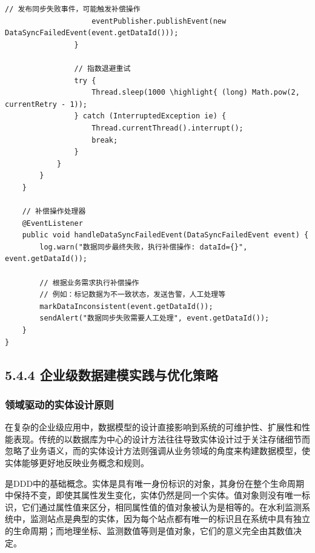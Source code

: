 \begin{lstlisting}[style=java]
                    // 发布同步失败事件，可能触发补偿操作
                    eventPublisher.publishEvent(new DataSyncFailedEvent(event.getDataId()));
                }
                
                // 指数退避重试
                try {
                    Thread.sleep(1000 \highlight{ (long) Math.pow(2, currentRetry - 1));
                } catch (InterruptedException ie) {
                    Thread.currentThread().interrupt();
                    break;
                }
            }
        }
    }
    
    // 补偿操作处理器
    @EventListener
    public void handleDataSyncFailedEvent(DataSyncFailedEvent event) {
        log.warn("数据同步最终失败，执行补偿操作: dataId={}", event.getDataId());
        
        // 根据业务需求执行补偿操作
        // 例如：标记数据为不一致状态，发送告警，人工处理等
        markDataInconsistent(event.getDataId());
        sendAlert("数据同步失败需要人工处理", event.getDataId());
    }
}
\end{lstlisting}

\hypertarget{ux4f01ux4e1aux7ea7ux6570ux636eux5efaux6a21ux5b9eux8df5ux4e0eux4f18ux5316ux7b56ux7565}{%
\subsection{5.4.4 企业级数据建模实践与优化策略}\label{ux4f01ux4e1aux7ea7ux6570ux636eux5efaux6a21ux5b9eux8df5ux4e0eux4f18ux5316ux7b56ux7565}}

\hypertarget{ux9886ux57dfux9a71ux52a8ux7684ux5b9eux4f53ux8bbeux8ba1ux539fux5219}{%
\subsubsection{领域驱动的实体设计原则}\label{ux9886ux57dfux9a71ux52a8ux7684ux5b9eux4f53ux8bbeux8ba1ux539fux5219}}

在复杂的企业级应用中，数据模型的设计直接影响到系统的可维护性、扩展性和性能表现。传统的以数据库为中心的设计方法往往导致实体设计过于关注存储细节而忽略了业务语义，而的实体设计方法则强调从业务领域的角度来构建数据模型，使实体能够更好地反映业务概念和规则。

是DDD中的基础概念。实体是具有唯一身份标识的对象，其身份在整个生命周期中保持不变，即使其属性发生变化，实体仍然是同一个实体。值对象则没有唯一标识，它们通过属性值来区分，相同属性值的值对象被认为是相等的。在水利监测系统中，监测站点是典型的实体，因为每个站点都有唯一的标识且在系统中具有独立的生命周期；而地理坐标、监测数值等则是值对象，它们的意义完全由其数值决定。

